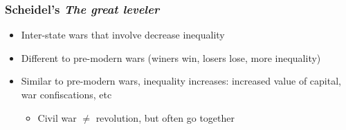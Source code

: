 \documentclass[aspectratio=43]{beamer}
\begin{document}
%
%

\begin{frame}
\frametitle{Scheidel's \textit{The great leveler}}
\centering

\begin{itemize}
  \item Inter-state wars that involve {\color{red}{mass-mobilization}} decrease inequality
  \item Different to pre-modern wars {\small (winers win, losers lose, more inequality)}
  \item<2-> {\color{red}{What about civil wars?}} Similar to pre-modern wars, inequality increases: increased value of capital, war confiscations, etc
  \begin{itemize}
    \item Civil war $\neq$ revolution, but often go together
  \end{itemize}
\end{itemize}


\end{frame}
\end{document}
